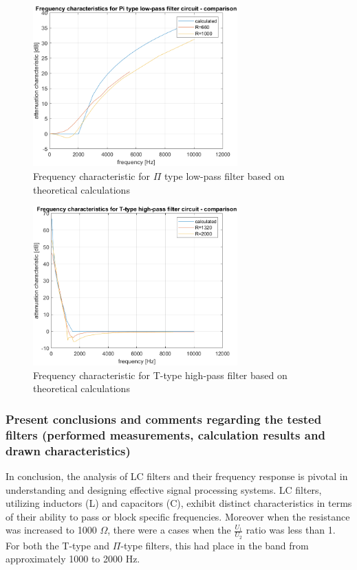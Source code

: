 \documentclass[]{scrartcl}
\begin{document}
\begin{figure}[H]
	\centering
	\includegraphics[width=0.7\textwidth]{Pictures/low_comp.png}
	\caption{Frequency characteristic for $\Pi$ type low-pass filter based on theoretical calculations}
	\label{fig:low-cal char-comp}
\end{figure}

\begin{figure}[H]
	\centering
	\includegraphics[width=0.7\textwidth]{Pictures/high_comp.png}
	\caption{Frequency characteristic for T-type high-pass filter based on theoretical calculations}
	\label{fig:high-cal char-comp}
\end{figure}

\subsubsection{Present conclusions and comments regarding the tested filters (performed measurements, calculation results and drawn characteristics)}

\begin{flushleft}
    In conclusion, the analysis of LC filters and their frequency response is pivotal in understanding and designing effective signal processing systems. LC filters, utilizing inductors (L) and capacitors (C), exhibit distinct characteristics in terms of their ability to pass or block specific frequencies. Moreover when the resistance was increased to 1000 $\Omega$, there were a cases when
    the $\frac{U_1}{U_2}$ ratio was less than 1. For both the T-type and $\Pi$-type filters, this had place in the band from approximately 1000 to 2000 Hz.
\end{flushleft}
\end{document}
